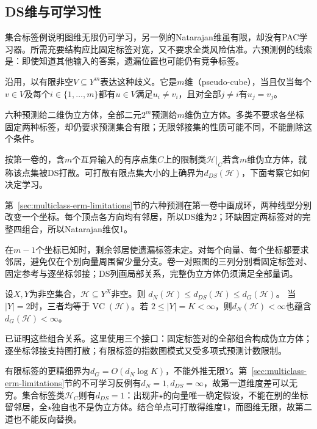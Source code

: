 \subsection{DS维与可学习性}
\label{sec:ds-dimension}

集合标签例说明图维无限仍可学习，另一例的Natarajan维虽有限，却没有PAC学习器。所需充要结构应比固定标签对宽，又不要求全类风险估准。六预测例的线索是：即使知道其他输入的答案，遗漏位置也可能仍有竞争标签。

沿用，以有限非空$V\subseteq Y^m$表达这种歧义。它是$m$维（pseudo-cube），当且仅当每个$v\in V$及每个$i\in\{1,\ldots,m\}$都有$u\in V$满足$u_i\neq v_i$，且对全部$j\neq i$有$u_j=v_j$。

六种预测给二维伪立方体，全部二元$2^m$预测给$m$维伪立方体。多类不要求各坐标固定两种标签，却仍要求预测集合有限；无限邻接集的性质可能不同，不能删除这个条件。

按第一卷的，含$m$个互异输入的有序点集$C$上的限制类$\mathcal H|_C$若含$m$维伪立方体，就称该点集被DS打散。可打散有限点集大小的上确界为$d_{DS}(\mathcal H)$，下面考察它如何决定学习。

第~\ref{sec:multiclass-erm-limitations}节的六种预测在第一卷中画成环，两种线型分别改变一个坐标。每个顶点各方向均有邻居，所以DS维为2；环缺固定两标签对的完整四组合，所以Natarajan维仅1。

在$m-1$个坐标已知时，剩余邻居使遗漏标签未定。对每个向量、每个坐标都要求邻居，避免仅在个别向量周围留少量分支。卷一对照图的三列分别看固定标签对、固定参考与逐坐标邻接；DS列画局部关系，完整伪立方体仍须满足全部量词。

\begin{theorem}[多分类维度的比较]
\label{thm:learning-multiclass-dimension-comparison}
设$X,Y$为非空集合，$\mathcal H\subseteq Y^X$非空。则
$d_N(\mathcal H)\leq d_{DS}(\mathcal H)\leq d_G(\mathcal H)$。
当$|Y|=2$时，三者均等于$\operatorname{VC}(\mathcal H)$。若
$2\leq|Y|=K<\infty$，则$d_N(\mathcal H)<\infty$也蕴含
$d_G(\mathcal H)<\infty$。
\end{theorem}

已证明这些组合关系。这里使用三个接口：固定标签对的全部组合构成伪立方体；逐坐标邻接支持图打散；有限标签的指数图模式又受多项式预测计数限制。

有限标签的更精细界为$d_G=O(d_N\log K)$，不能外推无限$Y$。第~\ref{sec:multiclass-erm-limitations}节的不可学习反例有$d_N=1,d_{DS}=\infty$，故第一道维度差可以无穷。集合标签类$\mathcal H_C$则有$d_{DS}=1$：出现非$\star$的向量唯一确定假设，不能在别的坐标留邻居，全$\star$独自也不是伪立方体。结合单点可打散得维度1，而图维无限，故第二道也不能反向替换。

